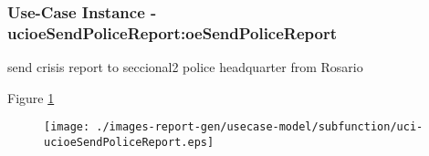 \subsubsection{Use-Case Instance - ucioeSendPoliceReport:oeSendPoliceReport}

 send crisis report to seccional2 police headquarter from Rosario 		  
\begin{operationmodel}

\end{operationmodel} 

Figure \ref{fig:lu.uni.lassy.excalibur.examples.icrash-RE-UC-uci-ucioeSendPoliceReport}

\begin{figure}[htbp]
\begin{center}

\texttt{[image: ./images-report-gen/usecase-model/subfunction/uci-ucioeSendPoliceReport.eps]}
\end{center}
\caption[lu.uni.lassy.excalibur.examples.icrash Sequence Diagram: uci-ucioeSendPoliceReport]{}
\label{fig:lu.uni.lassy.excalibur.examples.icrash-RE-UC-uci-ucioeSendPoliceReport}
\end{figure}
\vspace{0.5cm}
